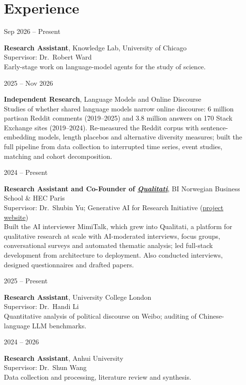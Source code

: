 \documentclass[11pt, a4paper]{article}
\newlength{\datelength}
\newlength{\contentlength}
\newcommand{\cventry}[2]{%
  \noindent
  \begin{minipage}[t]{\datelength}
    \raggedright #1
  \end{minipage}%
  \hspace{0.4cm}%
  \begin{minipage}[t]{\contentlength}
    \raggedright #2
  \end{minipage}%
  \par\vspace{6pt}%
}
\begin{document}
\section{Experience}

\cventry{Sep 2026 -- Present}{%
  \textbf{Research Assistant}, Knowledge Lab, University of Chicago\\
  Supervisor: Dr.\ Robert Ward\\
  Early-stage work on language-model agents for the study of science.}

\cventry{2025 -- Nov 2026}{%
  \textbf{Independent Research}, Language Models and Online Discourse\\
  Studies of whether shared language models narrow online discourse: 6 million partisan Reddit comments (2019--2025) and 3.8 million answers on 170 Stack Exchange sites (2019--2024). Re-measured the Reddit corpus with sentence-embedding models, length placebos and alternative diversity measures; built the full pipeline from data collection to interrupted time series, event studies, matching and cohort decomposition.}

\cventry{2024 -- Present}{%
  \textbf{Research Assistant and Co-Founder of \href{https://qualitati.com}{\textit{Qualitati}}}, BI Norwegian Business School \& HEC Paris\\
  Supervisor: Dr.\ Shubin Yu; Generative AI for Research Initiative (\href{https://www.gaiforresearch.com/about}{project website})\\
  Built the AI interviewer MimiTalk, which grew into Qualitati, a platform for qualitative research at scale with AI-moderated interviews, focus groups, conversational surveys and automated thematic analysis; led full-stack development from architecture to deployment. Also conducted interviews, designed questionnaires and drafted papers.}

\cventry{2025 -- Present}{%
  \textbf{Research Assistant}, University College London\\
  Supervisor: Dr.\ Handi Li\\
  Quantitative analysis of political discourse on Weibo; auditing of Chinese-language LLM benchmarks.}

\cventry{2024 -- 2026}{%
  \textbf{Research Assistant}, Anhui University\\
  Supervisor: Dr.\ Shun Wang\\
  Data collection and processing, literature review and synthesis.}
\end{document}
